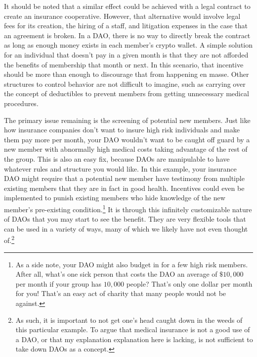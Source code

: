 \documentclass{article}[10pt]
\begin{document}
It should be noted that a similar effect could be achieved with a legal contract to create an insurance cooperative. 
However, that alternative would involve legal fees for its creation, the hiring of a staff, and litigation expenses in the case that an agreement is broken. 
In a DAO, there is no way to directly break the contract as long as enough money exists in each member's crypto wallet.
A simple solution for an individual that doesn't pay in a given month is that they are not afforded the benefits of membership that month or next.
In this scenario, that incentive should be more than enough to discourage that from happening en masse.
Other structures to control behavior are not difficult to imagine, such as carrying over the concept of deductibles to prevent members from getting unnecessary medical procedures.\par 

The primary issue remaining is the screening of potential new members. 
Just like how insurance companies don't want to insure high risk individuals and make them pay more per month, your DAO wouldn't want to be caught off guard by a new member with abnormally high medical costs taking advantage of the rest of the group. 
This is also an easy fix, because DAOs are manipulable to have whatever rules and structure you would like. 
In this example, your insurance DAO might require that a potential new member have testimony from multiple existing members that they are in fact in good health. 
Incentives could even be implemented to punish existing members who hide knowledge of the new member's pre-existing condition.\footnote{
    As a side note, your DAO might also budget in for a few high risk members.
    After all, what's one sick person that costs the DAO an average of $ \$ 10,000 $ per month if your group has $10,000$ people?
    That's only one dollar per month for you!
    That's an easy act of charity that many people would not be against. }
It is through this infinitely customizable nature of DAOs that you may start to see the benefit.
They are very flexible tools that can be used in a variety of ways, many of which we likely have not even thought of.\footnote{
    As such, it is important to not get one's head caught down in the weeds of this particular example.
    To argue that medical insurance is not a good use of a DAO, or that my explanation explanation here is lacking, is not sufficient to take down DAOs as a concept.} \par
\end{document}
